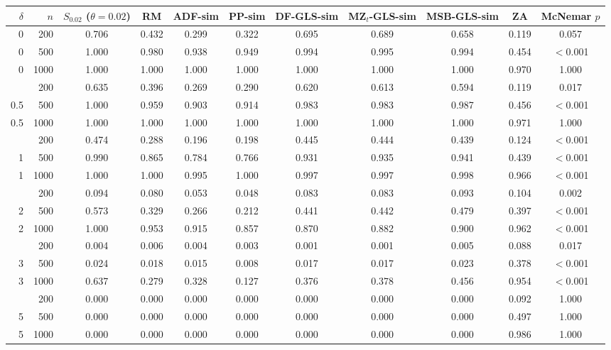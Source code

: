 \begin{tabular}{r r c c c c c c c c c }
\toprule
$\delta$ & $n$ & $S_{0.02}$ ($\theta = 0.02$) & RM & ADF-sim & PP-sim & DF-GLS-sim & MZ$_t$-GLS-sim & MSB-GLS-sim & ZA & McNemar $p$ \\
\midrule
0 & 200 & 0.706 & 0.432 & 0.299 & 0.322 & 0.695 & 0.689 & 0.658 & 0.119 & 0.057 \\
0 & 500 & 1.000 & 0.980 & 0.938 & 0.949 & 0.994 & 0.995 & 0.994 & 0.454 & $<$0.001 \\
0 & 1000 & 1.000 & 1.000 & 1.000 & 1.000 & 1.000 & 1.000 & 1.000 & 0.970 & 1.000 \\
\addlinespace
0.5 & 200 & 0.635 & 0.396 & 0.269 & 0.290 & 0.620 & 0.613 & 0.594 & 0.119 & 0.017 \\
0.5 & 500 & 1.000 & 0.959 & 0.903 & 0.914 & 0.983 & 0.983 & 0.987 & 0.456 & $<$0.001 \\
0.5 & 1000 & 1.000 & 1.000 & 1.000 & 1.000 & 1.000 & 1.000 & 1.000 & 0.971 & 1.000 \\
\addlinespace
1 & 200 & 0.474 & 0.288 & 0.196 & 0.198 & 0.445 & 0.444 & 0.439 & 0.124 & $<$0.001 \\
1 & 500 & 0.990 & 0.865 & 0.784 & 0.766 & 0.931 & 0.935 & 0.941 & 0.439 & $<$0.001 \\
1 & 1000 & 1.000 & 1.000 & 0.995 & 1.000 & 0.997 & 0.997 & 0.998 & 0.966 & $<$0.001 \\
\addlinespace
2 & 200 & 0.094 & 0.080 & 0.053 & 0.048 & 0.083 & 0.083 & 0.093 & 0.104 & 0.002 \\
2 & 500 & 0.573 & 0.329 & 0.266 & 0.212 & 0.441 & 0.442 & 0.479 & 0.397 & $<$0.001 \\
2 & 1000 & 1.000 & 0.953 & 0.915 & 0.857 & 0.870 & 0.882 & 0.900 & 0.962 & $<$0.001 \\
\addlinespace
3 & 200 & 0.004 & 0.006 & 0.004 & 0.003 & 0.001 & 0.001 & 0.005 & 0.088 & 0.017 \\
3 & 500 & 0.024 & 0.018 & 0.015 & 0.008 & 0.017 & 0.017 & 0.023 & 0.378 & $<$0.001 \\
3 & 1000 & 0.637 & 0.279 & 0.328 & 0.127 & 0.376 & 0.378 & 0.456 & 0.954 & $<$0.001 \\
\addlinespace
5 & 200 & 0.000 & 0.000 & 0.000 & 0.000 & 0.000 & 0.000 & 0.000 & 0.092 & 1.000 \\
5 & 500 & 0.000 & 0.000 & 0.000 & 0.000 & 0.000 & 0.000 & 0.000 & 0.497 & 1.000 \\
5 & 1000 & 0.000 & 0.000 & 0.000 & 0.000 & 0.000 & 0.000 & 0.000 & 0.986 & 1.000 \\
\bottomrule
\end{tabular}

